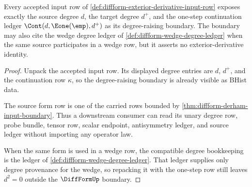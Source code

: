 \begin{theorem}
\label{thm:diffform-exterior-derivative-degree-shift-boundary}
Every accepted input row of
\autoref{def:diffform-exterior-derivative-input-row} exposes exactly the source
degree $d$, the target degree $d^+$, and the one-step continuation ledger
$\Cont(d,\Eone(\emp),d^+)$ as its degree-raising boundary. The boundary
may also cite the wedge degree ledger of \autoref{def:diffform-wedge-degree-ledger}
when the same source participates in a wedge row, but it asserts no
exterior-derivative identity.
\end{theorem}
\begin{proof}
Unpack the accepted input row. Its displayed degree entries are $d$, $d^+$, and
the continuation row $\kappa$, so the degree-raising boundary is already visible
as BHist data.

The source form row is one of the carried rows bounded by
\autoref{thm:diffform-derham-input-boundary}. Thus a downstream consumer can
read its unary degree row, probe bundle, tensor row, scalar endpoint,
antisymmetry ledger, and source ledger without importing any operator law.

When the same form is used in a wedge row, the compatible degree bookkeeping is
the ledger of \autoref{def:diffform-wedge-degree-ledger}. That ledger supplies
only degree provenance for the wedge, so repacking it with the one-step row
still leaves $d^2=0$ outside the $\DiffFormUp$ boundary.
\end{proof}

